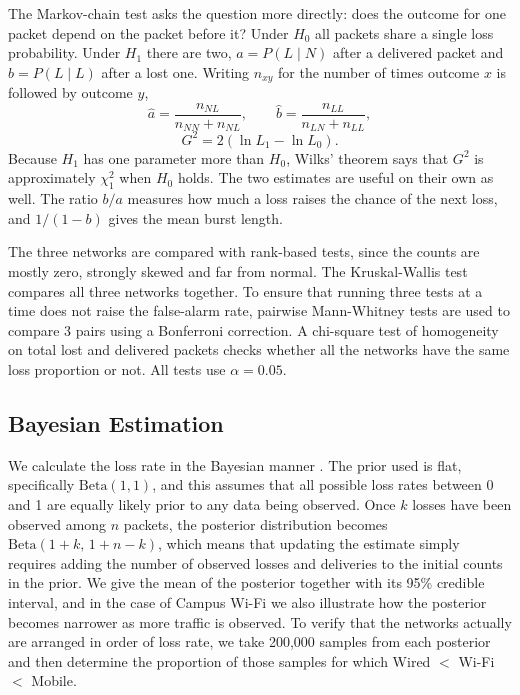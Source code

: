 \documentclass[conference]{IEEEtran}
\begin{document}
The Markov-chain test asks the question more directly: does the outcome for one packet depend on the packet before it? Under $H_0$ all packets share a single loss probability. Under $H_1$ there are two, $a=P(L\mid N)$ after a delivered packet and $b=P(L\mid L)$ after a lost one. Writing $n_{xy}$ for the number of times outcome $x$ is followed by outcome $y$,
\begin{equation}
\hat a=\frac{n_{NL}}{n_{NN}+n_{NL}},\qquad \hat b=\frac{n_{LL}}{n_{LN}+n_{LL}},
\end{equation}
\begin{equation}
G^2=2(\ln L_1-\ln L_0).
\end{equation}
Because $H_1$ has one parameter more than $H_0$, Wilks' theorem \cite{wilks1938} says that $G^2$ is approximately $\chi^2_1$ when $H_0$ holds. The two estimates are useful on their own as well. The ratio $b/a$ measures how much a loss raises the chance of the next loss, and $1/(1-b)$ gives the mean burst length.

The three networks are compared with rank-based tests, since the counts are mostly zero, strongly skewed and far from normal. The Kruskal-Wallis test \cite{kruskal1952} compares all three networks together. To ensure that running three tests at a time does not raise the false-alarm rate, pairwise Mann-Whitney tests \cite{mann1947} are used to compare 3 pairs using a Bonferroni correction. A chi-square test of homogeneity on total lost and delivered packets checks whether all the networks have the same loss proportion or not. All tests use $\alpha=0.05$.

\subsection{Bayesian Estimation}
We calculate the loss rate in the Bayesian manner \cite{gelman2013}. The prior used is flat, specifically $\text{Beta}(1,1)$, and this assumes that all possible loss rates between 0 and 1 are equally likely prior to any data being observed. Once $k$ losses have been observed among $n$ packets, the posterior distribution becomes $\text{Beta}(1+k,\,1+n-k)$, which means that updating the estimate simply requires adding the number of observed losses and deliveries to the initial counts in the prior. We give the mean of the posterior together with its 95\% credible interval, and in the case of Campus Wi-Fi we also illustrate how the posterior becomes narrower as more traffic is observed. To verify that the networks actually are arranged in order of loss rate, we take 200,000 samples from each posterior and then determine the proportion of those samples for which Wired $<$ Wi-Fi $<$ Mobile.
\end{document}
